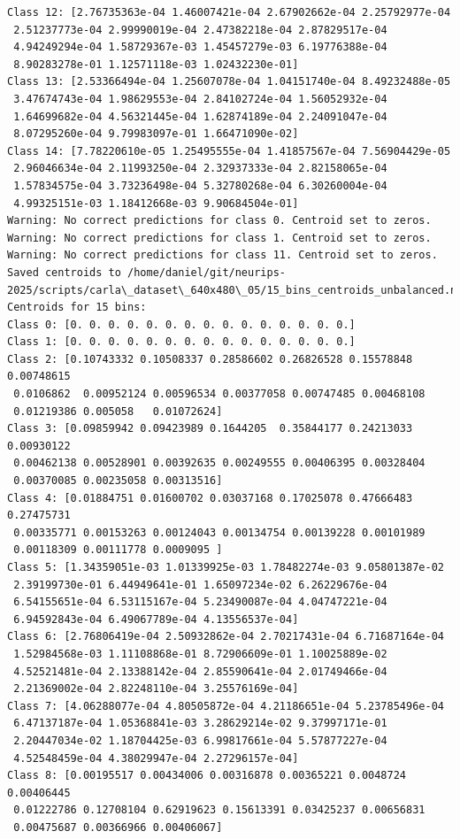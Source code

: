 \begin{verbatim}
Class 12: [2.76735363e-04 1.46007421e-04 2.67902662e-04 2.25792977e-04
 2.51237773e-04 2.99990019e-04 2.47382218e-04 2.87829517e-04
 4.94249294e-04 1.58729367e-03 1.45457279e-03 6.19776388e-04
 8.90283278e-01 1.12571118e-03 1.02432230e-01]
Class 13: [2.53366494e-04 1.25607078e-04 1.04151740e-04 8.49232488e-05
 3.47674743e-04 1.98629553e-04 2.84102724e-04 1.56052932e-04
 1.64699682e-04 4.56321445e-04 1.62874189e-04 2.24091047e-04
 8.07295260e-04 9.79983097e-01 1.66471090e-02]
Class 14: [7.78220610e-05 1.25495555e-04 1.41857567e-04 7.56904429e-05
 2.96046634e-04 2.11993250e-04 2.32937333e-04 2.82158065e-04
 1.57834575e-04 3.73236498e-04 5.32780268e-04 6.30260004e-04
 4.99325151e-03 1.18412668e-03 9.90684504e-01]
Warning: No correct predictions for class 0. Centroid set to zeros.
Warning: No correct predictions for class 1. Centroid set to zeros.
Warning: No correct predictions for class 11. Centroid set to zeros.
Saved centroids to /home/daniel/git/neurips-2025/scripts/carla\_dataset\_640x480\_05/15_bins_centroids_unbalanced.npy
Centroids for 15 bins:
Class 0: [0. 0. 0. 0. 0. 0. 0. 0. 0. 0. 0. 0. 0. 0. 0.]
Class 1: [0. 0. 0. 0. 0. 0. 0. 0. 0. 0. 0. 0. 0. 0. 0.]
Class 2: [0.10743332 0.10508337 0.28586602 0.26826528 0.15578848 0.00748615
 0.0106862  0.00952124 0.00596534 0.00377058 0.00747485 0.00468108
 0.01219386 0.005058   0.01072624]
Class 3: [0.09859942 0.09423989 0.1644205  0.35844177 0.24213033 0.00930122
 0.00462138 0.00528901 0.00392635 0.00249555 0.00406395 0.00328404
 0.00370085 0.00235058 0.00313516]
Class 4: [0.01884751 0.01600702 0.03037168 0.17025078 0.47666483 0.27475731
 0.00335771 0.00153263 0.00124043 0.00134754 0.00139228 0.00101989
 0.00118309 0.00111778 0.0009095 ]
Class 5: [1.34359051e-03 1.01339925e-03 1.78482274e-03 9.05801387e-02
 2.39199730e-01 6.44949641e-01 1.65097234e-02 6.26229676e-04
 6.54155651e-04 6.53115167e-04 5.23490087e-04 4.04747221e-04
 6.94592843e-04 6.49067789e-04 4.13556537e-04]
Class 6: [2.76806419e-04 2.50932862e-04 2.70217431e-04 6.71687164e-04
 1.52984568e-03 1.11108868e-01 8.72906609e-01 1.10025889e-02
 4.52521481e-04 2.13388142e-04 2.85590641e-04 2.01749466e-04
 2.21369002e-04 2.82248110e-04 3.25576169e-04]
Class 7: [4.06288077e-04 4.80505872e-04 4.21186651e-04 5.23785496e-04
 6.47137187e-04 1.05368841e-03 3.28629214e-02 9.37997171e-01
 2.20447034e-02 1.18704425e-03 6.99817661e-04 5.57877227e-04
 4.52548459e-04 4.38029947e-04 2.27296157e-04]
Class 8: [0.00195517 0.00434006 0.00316878 0.00365221 0.0048724  0.00406445
 0.01222786 0.12708104 0.62919623 0.15613391 0.03425237 0.00656831
 0.00475687 0.00366966 0.00406067]

\end{verbatim}
